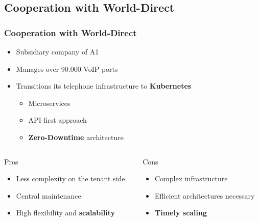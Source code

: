 \documentclass[11pt,t,usepdftitle=false,aspectratio=169]{beamer}
\begin{document}
\subsection{Cooperation with World-Direct}
\begin{frame}
	\frametitle{Cooperation with {\color{uibkblue} World-Direct}}
	
	
	\begin{itemize}
		\item Subsidiary company of A1
		\item Manages over 90.000 VoIP ports
		\item Transitions its telephone infrastructure to \textbf{\color{uibkorange} Kubernetes}
		\begin{itemize}
			\item Microservices
			\item API-first approach
			\item \textbf{{\color{uibkorange} Zero-Downtime}} architecture
		\end{itemize}
	\end{itemize}
	
	\begin{columns}
		\begin{column}{0.5\textwidth}		
			\begin{block}{Pros}
				\begin{itemize}
					\item Less complexity on the tenant side
					\item Central maintenance
					\item High flexibility and \textbf{\color{uibkorange} scalability}
				\end{itemize}
			\end{block}
		\end{column}
		
		\begin{column}{0.5\textwidth}		
			\begin{block}{Cons}
				\begin{itemize}
					\item Complex infrastructure
					\item Efficient architectures necessary
					\item \textbf{\color{red} Timely scaling}
				\end{itemize}
			\end{block}
		\end{column}
	\end{columns}
\end{frame}
\end{document}
